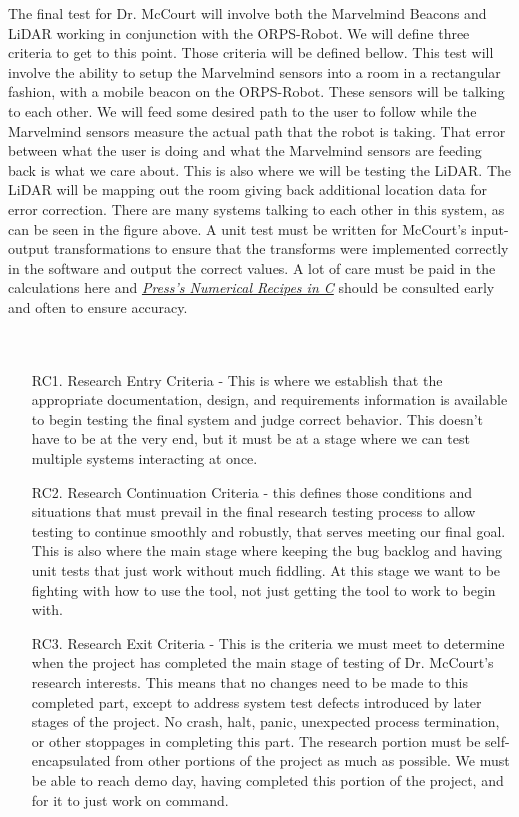 \documentclass[english,12pt]{article}
\begin{document}
\newpage
The final test for Dr. McCourt will involve both the Marvelmind Beacons and 
LiDAR working in conjunction with the ORPS-Robot. We will define three criteria 
to get to this point. Those criteria will be defined bellow. This test will involve 
the ability to setup the Marvelmind sensors into a room in a rectangular fashion, with 
a mobile beacon on the ORPS-Robot. These sensors will be talking to each other. We will 
feed some desired path to the user to follow while the Marvelmind sensors measure the actual 
path that the robot is taking. That error between what the user is doing and what the Marvelmind 
sensors are feeding back is what we care about. This is also where we will be testing the LiDAR. The 
LiDAR will be mapping out the room giving back additional location data for error correction. There 
are many systems talking to each other in this system, as can be seen in the figure above. A unit test 
must be written for McCourt's input-output transformations to ensure that the transforms 
were implemented correctly in the software and output the correct values. A lot of care must be paid in the 
calculations here and \href{http://numerical.recipes/}{\textit{Press's Numerical Recipes in C}} should be 
consulted early and often to ensure accuracy.\\\\\\
\begin{itemize}
    \item[RC1.] Research Entry Criteria - This is where we establish that the appropriate 
    documentation, design, and requirements information is available to begin testing 
    the final system and judge correct behavior. This doesn't have to be at the very end, 
    but it must be at a stage where we can test multiple systems interacting at once.
    \item[RC2.] Research Continuation Criteria - this defines those conditions and situations that must 
    prevail in the final research testing process to allow testing to continue smoothly and robustly, that 
    serves meeting our final goal. This is also where the main stage where keeping the bug backlog 
    and having unit tests that just work without much fiddling. At this stage we want to be fighting 
    with how to use the tool, not just getting the tool to work to begin with.
    \item[RC3.] Research Exit Criteria  - This is the criteria we must meet to determine when the project has completed 
    the main stage of testing of Dr. McCourt’s research interests. This means that no changes need to be made to 
    this completed part, except to address system test defects introduced by later stages of the project. 
    No crash, halt, panic, unexpected process termination, or other stoppages in completing this part. The research 
    portion must be self-encapsulated from other portions of the project as much as possible. We must be able to reach 
    demo day, having completed this portion of the project, and for it to just work on command.
\end{itemize} 
\end{document}
